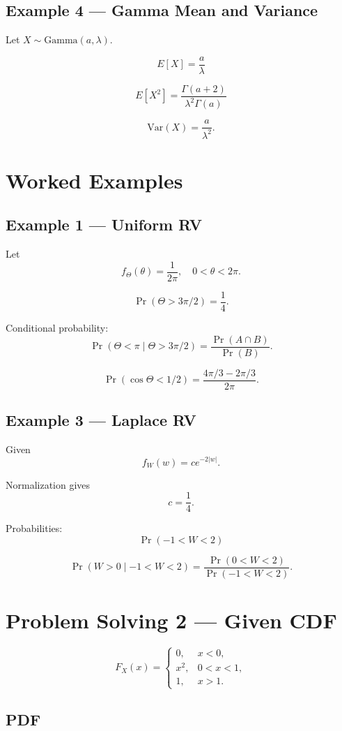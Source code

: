 \documentclass[11pt]{article}
\begin{document}
\subsection{Example 4 — Gamma Mean and Variance}

Let $X\sim \text{Gamma}(a,\lambda)$.

\[
E[X]=\frac{a}{\lambda}
\]

\[
E[X^2]=\frac{\Gamma(a+2)}{\lambda^2\Gamma(a)}
\]

\[
\text{Var}(X)=\frac{a}{\lambda^2}.
\]

\section{Worked Examples}

\subsection{Example 1 — Uniform RV}

Let
\[
f_\Theta(\theta)=\frac{1}{2\pi}, \quad 0<\theta<2\pi.
\]

\[
\Pr(\Theta>3\pi/2)=\frac14.
\]

Conditional probability:
\[
\Pr(\Theta<\pi\mid \Theta>3\pi/2)
=
\frac{\Pr(A\cap B)}{\Pr(B)}.
\]

\[
\Pr(\cos\Theta<1/2)
=
\frac{4\pi/3-2\pi/3}{2\pi}.
\]

\subsection{Example 3 — Laplace RV}

Given
\[
f_W(w)=ce^{-2|w|}.
\]

Normalization gives
\[
c=\frac14.
\]

Probabilities:
\[
\Pr(-1<W<2)
\]

\[
\Pr(W>0\mid -1<W<2)=
\frac{\Pr(0<W<2)}{\Pr(-1<W<2)}.
\]

\section{Problem Solving 2 — Given CDF}

\[
F_X(x)=
\begin{cases}
0, & x<0,\\
x^2, & 0<x<1,\\
1, & x>1.
\end{cases}
\]

\subsection*{PDF}
\end{document}

